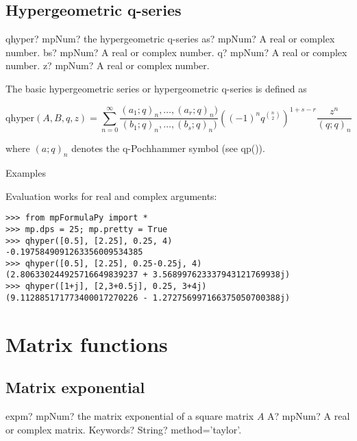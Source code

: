 \newpage
\section{Hypergeometric q-series}


\begin{mpFunctionsExtract}
	\mpFunctionFour
	{qhyper? mpNum? the hypergeometric q-series}
	{as? mpNum? A real or complex number.}
	{bs? mpNum? A real or complex number.}	
	{q? mpNum? A real or complex number.}		
	{z? mpNum? A real or complex number.}		
\end{mpFunctionsExtract}


The basic hypergeometric series or hypergeometric q-series is defined as

\begin{equation}
\text{qhyper}(A, B, q, z) = \sum_{n=0}^{\infty} \frac{(a_1;q)_n,\ldots,(a_r;q)_n)}{(b_1;q)_n,\ldots,(b_s;q)_n)} \left((-1)^n q^{\binom{n}{2}}  \right)^{1+s-r} \frac{z^n}{(q;q)_n}
\end{equation}

where $(a;q)_n$ denotes the q-Pochhammer symbol (see qp()).

Examples

Evaluation works for real and complex arguments:

\begin{lstlisting}
>>> from mpFormulaPy import *
>>> mp.dps = 25; mp.pretty = True
>>> qhyper([0.5], [2.25], 0.25, 4)
-0.1975849091263356009534385
>>> qhyper([0.5], [2.25], 0.25-0.25j, 4)
(2.806330244925716649839237 + 3.568997623337943121769938j)
>>> qhyper([1+j], [2,3+0.5j], 0.25, 3+4j)
(9.112885171773400017270226 - 1.272756997166375050700388j)
\end{lstlisting}





\chapter{Matrix functions}

\section{Matrix exponential}


\begin{mpFunctionsExtract}
	\mpFunctionTwo
	{expm? mpNum? the matrix exponential of a square matrix $A$}
	{A? mpNum? A real or complex matrix.}
	{Keywords? String? method='taylor'.}	
\end{mpFunctionsExtract}

